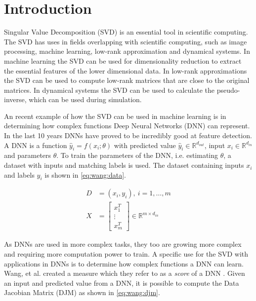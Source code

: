 \chapter {Introduction}

Singular Value Decomposition (SVD) is an essential tool in scientific computing. The SVD has uses in fields overlapping with scientific computing, such as image processing, machine learning, low-rank approximation and dynamical systems. In machine learning the SVD can be used for dimensionality reduction to extract the essential features of the lower dimensional data. In low-rank approximations the SVD can be used to compute low-rank matrices that are close to the original matrices. In dynamical systems the SVD can be used to calculate the pseudo-inverse, which can be used during simulation.

An recent example of how the SVD can be used in machine learning is in determining how complex functions Deep Neural Networks (DNN) can represent. In the last 10 years DNNs have proved to be incredibly good at feature detection. A DNN is a function $\hat y_i = f(x_i; \theta)$ with predicted value $\hat y_i \in \mathbb{R}^{d_{out}}$, input $x_i \in \mathbb{R}^{d_{in}}$ and parameters $\theta$. To train the parameters of the DNN, i.e. estimating $\theta$, a dataset with inputs and matching labels is used. The dataset containing inputs $x_i$ and labels $y_i$ is shown in \eqref{eq:wang:data}.

\begin{equation} \label{eq:wang:data}
  \begin{split}
    D &= {(x_i,y_i)},\ i=1,\dotsc,m \\
    X &=
    \begin{bmatrix}
      x_1^T \\
      \vdots \\
      x_m^T
    \end{bmatrix} \in \mathbb{R}^{m \times d_{in}}
  \end{split}
\end{equation}

As DNNs are used in more complex tasks, they too are growing more complex and requiring more computation power to train. A specific use for the SVD with applications in DNNs is to determine how complex functions a DNN can learn. Wang, et al. created a measure which they refer to as a \textit{score} of a DNN \cite{icml16:wang:edjm}. Given an input and predicted value from a DNN, it is possible to compute the Data Jacobian Matrix (DJM) \cite{icml16:wang:edjm} as shown in \eqref{eq:wang:djm}.

